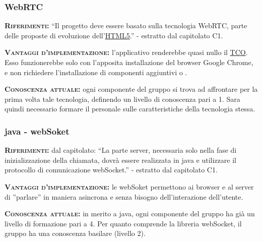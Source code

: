 \subsubsection{WebRTC}
\begin{description}
	\item{\scshape\bfseries Riferimenti:} ``Il progetto deve essere basato sulla tecnologia WebRTC, parte delle proposte di evoluzione dell'\underline{HTML5}.'' - estratto dal capitolato C1.

	\item{\scshape\bfseries Vantaggi d'implementazione:} l'applicativo renderebbe quasi nullo il \underline{TCO}. Esso funzionerebbe solo con l'apposita installazione del browser Google Chrome, e non richiedere l'installazione di componenti aggiuntivi o .
	
	\item{\scshape\bfseries Conoscenza attuale:} ogni componente del gruppo si trova ad affrontare per la prima volta tale tecnologia, definendo un livello di conoscenza pari a 1. Sara quindi necessario formare il personale sulle caratteristiche della tecnologia stessa.
\end{description}

\subsubsection{java - webSoket}
\begin{description}
	\item{\scshape\bfseries Riferimenti:} dal capitolato: ``La parte server, necessaria solo nella fase di inizializzazione della chiamata, dovrà essere realizzata in java e utilizzare il protocollo di comunicazione webSocket.'' - estratto dal capitolato C1.
	
	\item{\scshape\bfseries Vantaggi d'implementazione:} le webSoket permettono ai browser e al server di ''parlare'' in maniera asincrona e senza bisogno dell'interazione dell'utente.

	\item{\scshape\bfseries Conoscenza attuale:} in merito a java, ogni componente del gruppo ha già un livello di formazione pari a 4. Per quanto comprende la libreria  webSocket, il gruppo ha una conoscenza basilare (livello 2).  
\end{description}
